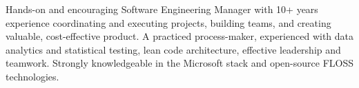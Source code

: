 \documentclass[9pt]{developercv} %
\begin{document}
\vspace{0.5cm}



\begin{minipage}[t]{0.4\textwidth} %
	\vspace{-\baselineskip} %
	
Hands-on and encouraging Software Engineering Manager with 10+ years experience coordinating and executing projects, building teams, and creating valuable, cost-effective product. A practiced process-maker, experienced with data analytics and statistical testing, lean code architecture, effective leadership and teamwork. Strongly knowledgeable in the Microsoft stack and open-source FLOSS technologies.
\end{minipage}
\hfill %
\begin{minipage}[t]{0.5\textwidth} %
	\vspace{-\baselineskip} %
	\begin{barchart}{5.5}
	\end{barchart}
\end{minipage}


\def\innerradius{1.2cm}
\def\outerradius{1.6cm}
\end{document}
